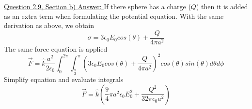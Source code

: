 \documentclass[12pt]{article}
\begin{document}
    \underline{Question 2.9, Section b) Answer: }
    \newline 
    If there sphere has a charge ($Q$) then it is added as an extra term when formulating the potential equation. With the same derivation as above, we obtain
    \begin{equation} \label{eq: 4.2.1}
        \sigma = 3 \epsilon_0 E_0 cos(\theta) + \frac{Q}{4 \pi a^2}
    \end{equation}
    The same force equation is applied
    \begin{equation} \label{eq: 4.2.2}
        \vec{F} = \hat{k} \frac{a^2}{2 \epsilon_0} \int_0^{2\pi} \int_{\frac{\pi}{2}}^\pi \left(3 \epsilon_0 E_0 cos(\theta) + \frac{Q}{4 \pi a^2} \right)^2 cos(\theta) sin(\theta) d\theta d\phi  
    \end{equation}
    Simplify equation and evaluate integrals
    \begin{equation} \label{eq: 4.2.3}
        \vec{F} = \hat{k} \left(\frac{9}{4} \pi a^2 \epsilon_0 E_0^2 + \frac{Q^2}{32 \pi \epsilon_0 a^2} \right)
    \end{equation}

    



    
    
\newpage
\printbibliography
\end{document}
